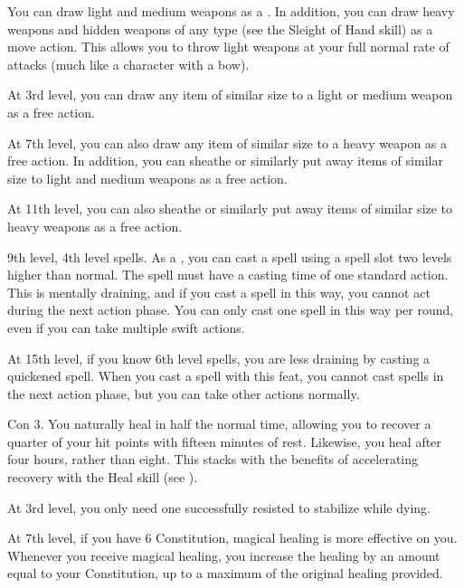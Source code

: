     \featben You can draw light and medium weapons as a .
    In addition, you can draw heavy weapons and hidden weapons of any type (see the Sleight of Hand skill) as a move action.
    This allows you to throw light weapons at your full normal rate of attacks (much like a character with a bow).

    At 3rd level, you can draw any item of similar size to a light or medium weapon as a free action.

    At 7th level, you can also draw any item of similar size to a heavy weapon as a free action.
    In addition, you can sheathe or similarly put away items of similar size to light and medium weapons as a free action.

    At 11th level, you can also sheathe or similarly put away items of similar size to heavy weapons as a free action.

    \featpre 9th level, 4th level spells.
    \featben As a , you can cast a spell using a spell slot two levels higher than normal.
    The spell must have a casting time of one standard action.
    This is mentally draining, and if you cast a spell in this way, you cannot act during the next action phase.
    You can only cast one spell in this way per round, even if you can take multiple swift actions.

    At 15th level, if you know 6th level spells, you are less draining by casting a quickened spell.
    When you cast a spell with this feat, you cannot cast spells in the next action phase, but you can take other actions normally.

    \featpre Con 3.
    \featben You naturally heal in half the normal time, allowing you to recover a quarter of your hit points with fifteen minutes of rest.
    Likewise, you heal  after four hours, rather than eight.
    This stacks with the benefits of accelerating recovery with the Heal skill (see ).

    At 3rd level, you only need one successfully resisted  to stabilize while dying.

    At 7th level, if you have 6 Constitution, magical healing is more effective on you.
    Whenever you receive magical healing, you increase the healing by an amount equal to your Constitution, up to a maximum of the original healing provided.

